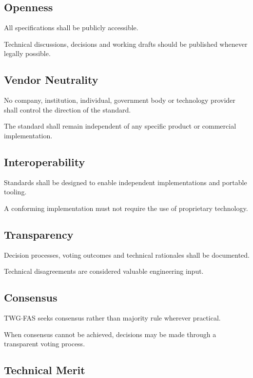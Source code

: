 \documentclass[11pt,a4paper]{article}
\begin{document}
\subsection{Openness}

All specifications shall be publicly accessible.

Technical discussions, decisions and working drafts should be published
whenever legally possible.

\subsection{Vendor Neutrality}

No company, institution, individual, government body or technology
provider shall control the direction of the standard.

The standard shall remain independent of any specific product or
commercial implementation.

\subsection{Interoperability}

Standards shall be designed to enable independent implementations and
portable tooling.

A conforming implementation must not require the use of proprietary
technology.

\subsection{Transparency}

Decision processes, voting outcomes and technical rationales shall be
documented.

Technical disagreements are considered valuable engineering input.

\subsection{Consensus}

TWG$\cdot$FAS seeks consensus rather than majority rule wherever
practical.

When consensus cannot be achieved, decisions may be made through a
transparent voting process.

\subsection{Technical Merit}
\end{document}

